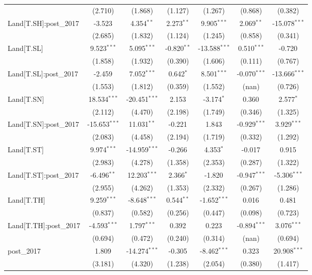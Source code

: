 \begin{table}[!htbp]
\begin{tabular}{@{\extracolsep{5pt}}lcccccc}
  & (2.710) & (1.868) & (1.127) & (1.267) & (0.868) & (0.382) \\
 Land[T.SH]:post_2017 & -3.523$^{}$ & 4.354$^{**}$ & 2.273$^{**}$ & 9.905$^{***}$ & 2.069$^{**}$ & -15.078$^{***}$ \\
  & (2.685) & (1.832) & (1.124) & (1.245) & (0.858) & (0.341) \\
 Land[T.SL] & 9.523$^{***}$ & 5.095$^{***}$ & -0.820$^{**}$ & -13.588$^{***}$ & 0.510$^{***}$ & -0.720$^{}$ \\
  & (1.858) & (1.932) & (0.390) & (1.606) & (0.111) & (0.767) \\
 Land[T.SL]:post_2017 & -2.459$^{}$ & 7.052$^{***}$ & 0.642$^{*}$ & 8.501$^{***}$ & -0.070$^{***}$ & -13.666$^{***}$ \\
  & (1.553) & (1.812) & (0.359) & (1.552) & (nan) & (0.726) \\
 Land[T.SN] & 18.534$^{***}$ & -20.451$^{***}$ & 2.153$^{}$ & -3.174$^{*}$ & 0.360$^{}$ & 2.577$^{*}$ \\
  & (2.112) & (4.470) & (2.198) & (1.749) & (0.346) & (1.325) \\
 Land[T.SN]:post_2017 & -15.653$^{***}$ & 11.031$^{**}$ & -0.221$^{}$ & 1.843$^{}$ & -0.929$^{***}$ & 3.929$^{***}$ \\
  & (2.083) & (4.458) & (2.194) & (1.719) & (0.332) & (1.292) \\
 Land[T.ST] & 9.974$^{***}$ & -14.959$^{***}$ & -0.266$^{}$ & 4.353$^{*}$ & -0.017$^{}$ & 0.915$^{}$ \\
  & (2.983) & (4.278) & (1.358) & (2.353) & (0.287) & (1.322) \\
 Land[T.ST]:post_2017 & -6.496$^{**}$ & 12.203$^{***}$ & 2.366$^{*}$ & -1.820$^{}$ & -0.947$^{***}$ & -5.306$^{***}$ \\
  & (2.955) & (4.262) & (1.353) & (2.332) & (0.267) & (1.286) \\
 Land[T.TH] & 9.259$^{***}$ & -8.648$^{***}$ & 0.544$^{**}$ & -1.652$^{***}$ & 0.016$^{}$ & 0.481$^{}$ \\
  & (0.837) & (0.582) & (0.256) & (0.447) & (0.098) & (0.723) \\
 Land[T.TH]:post_2017 & -4.593$^{***}$ & 1.797$^{***}$ & 0.392$^{}$ & 0.223$^{}$ & -0.894$^{***}$ & 3.076$^{***}$ \\
  & (0.694) & (0.472) & (0.240) & (0.314) & (nan) & (0.694) \\
 post_2017 & 1.809$^{}$ & -14.274$^{***}$ & -0.305$^{}$ & -8.462$^{***}$ & 0.323$^{}$ & 20.908$^{***}$ \\
  & (3.181) & (4.320) & (1.238) & (2.054) & (0.380) & (1.417) \\

\end{tabular}
\end{table}
